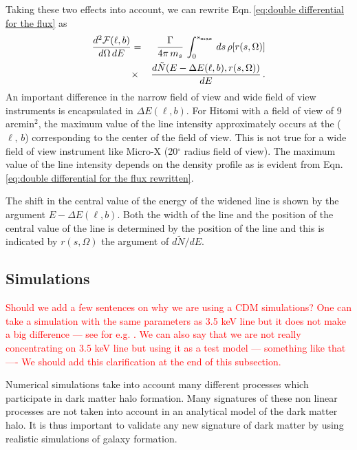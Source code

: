 \documentclass[aps,prd,10pt,twocolumn,superscriptaddress,showpacs]{revtex4-1}
\begin{document}
Taking these two effects into account, we can rewrite Eqn.\,\ref{eq:double differential for the flux} as 
\begin{eqnarray}
\dfrac{d^2 \mathcal{F} (\ell, b)}{d\Omega \, dE} &=&  \dfrac{\Gamma}{4\pi \, m_s} \, \int _0 ^{s_{\rm max}}  \, ds \, \rho[r(s, \Omega)] \nonumber\\
&\times& \dfrac{d \tilde{N}(E - \Delta E (\ell, b), r(s, \Omega))}{dE} \,.
\label{eq:double differential for the flux rewritten}
\end{eqnarray}
An important difference in the narrow field of view and wide field of view instruments is encapsulated in $\Delta E (\ell, b)$.  For Hitomi with a field of view of 9 arcmin$^2$, the maximum value of the line intensity approximately occurs at the ($\ell, \, b$) corresponding to the center of the field of view.  This is not true for a wide field of view instrument like Micro-X (20$^\circ$ radius field of view).  The maximum value of the line intensity depends on the density profile as is evident from Eqn.\,\ref{eq:double differential for the flux rewritten}.  

The shift in the central value of the energy of the widened line is shown by the argument $E - \Delta E (\ell, b)$.  Both the width of the line and the position of the central value of the line is determined by the position of the line and this is indicated by $r (s, \Omega)$ the argument of $d\tilde{N}/dE$.


\subsection{Simulations}
\label{sec:simulations}

\textcolor{red}{Should we add a few sentences on why we are using a CDM simulations?  One can take a simulation with the same parameters as 3.5 keV line but it does not make a big difference --- see for e.g. \cite{Lovell:2014lea}.  We can also say that we are not really concentrating on 3.5 keV line but using it as a test model --- something like that ---- We should add this clarification at the end of this subsection.}  

Numerical simulations take into account many different processes which participate in dark matter halo formation.  Many signatures of these non linear processes are not taken into account in an analytical model of the dark matter halo.  It is thus important to validate any new signature of dark matter by using realistic simulations of galaxy formation.
\end{document}

